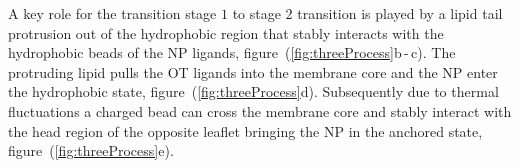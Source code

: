 A key role for the transition stage $1$ to stage $2$ transition is played by a lipid tail protrusion out of the hydrophobic region that stably interacts with the hydrophobic beads of the \ac{NP} ligands, 
figure~(\ref{fig:threeProcess}b\,-\,c). The protruding lipid pulls the \ac{OT} ligands into the membrane core and the \ac{NP} enter the hydrophobic state, figure~(\ref{fig:threeProcess}d). Subsequently due to thermal fluctuations a charged bead can cross the membrane core and stably interact with the head region of the opposite leaflet bringing the \ac{NP} in the anchored state, figure~(\ref{fig:threeProcess}e).
\begin{figure}[t]
	\centering
	\quad%
	\quad%
	\\%
	\quad%

\end{figure}
